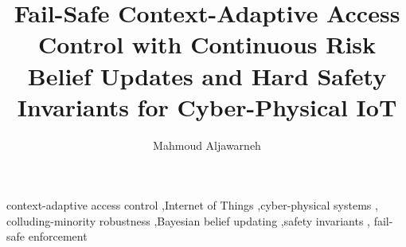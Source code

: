 \documentclass[preprint,12pt]{elsarticle}
\begin{document}
\begin{frontmatter}
\title{Fail-Safe Context-Adaptive Access Control with Continuous Risk Belief Updates and Hard Safety Invariants for Cyber-Physical IoT}
\author[asu]{Mahmoud Aljawarneh}
\begin{abstract}

\end{abstract}
\begin{keyword}
context-adaptive access control \sep Internet of Things \sep cyber-physical systems \sep
colluding-minority robustness \sep Bayesian belief updating \sep safety invariants \sep
fail-safe enforcement
\end{keyword}
\end{frontmatter}













\end{document}
